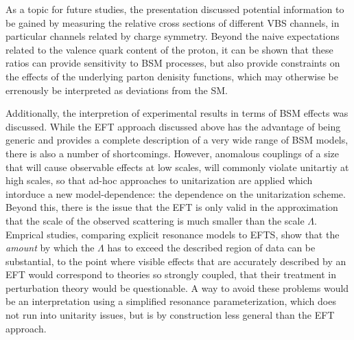 As a topic for future studies, the presentation discussed potential information to be gained by measuring the relative cross sections of different VBS channels, in particular channels related by charge symmetry. Beyond the naive expectations related to the valence quark content of the proton, it can be shown that these ratios can provide sensitivity to BSM processes, but also provide constraints on the effects of the underlying parton denisity functions, which may otherwise be errenously be interpreted as deviations from the SM.

Additionally, the interpretion of experimental results in terms of BSM effects was discussed. While the EFT approach discussed above has the advantage of being generic and provides a complete description of a very wide range of BSM models, there is also a number of shortcomings. However, anomalous couplings of a size that will cause observable effects at low scales, will  commonly violate unitartiy at high scales, so that ad-hoc approaches to unitarization are applied which intorduce a new model-dependence: the dependence on the unitarization scheme.
Beyond this, there is the issue that the EFT is only valid in the approximation that the scale of the observed scattering is much smaller than the scale $\Lambda$. Emprical studies, comparing explicit resonance models to EFTS, show that the \textit{amount} by which the $\Lambda$ has to exceed the described region of data can be substantial, to the point where visible effects that are accurately described by an EFT would correspond to theories so strongly coupled, that their treatment in perturbation theory would be questionable. A way to avoid these problems would be an interpretation using a simplified resonance parameterization, which does not run into unitarity issues, but is by construction less general than the EFT approach.



